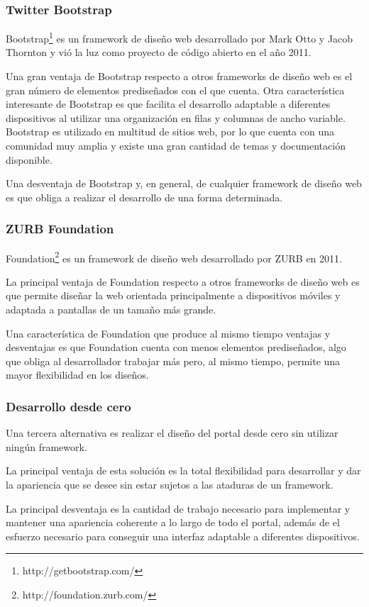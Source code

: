 \subsubsection{Twitter Bootstrap}
Bootstrap\footnote{http://getbootstrap.com/} es un framework de diseño web desarrollado por Mark Otto y Jacob Thornton y vió la luz como proyecto de código abierto en el año 2011.

Una gran ventaja de Bootstrap respecto a otros frameworks de diseño web es el gran número de elementos prediseñados con el que cuenta. Otra característica interesante de Bootstrap es que facilita el desarrollo adaptable a diferentes dispositivos al utilizar una organización en filas y columnas de ancho variable.\\
Bootstrap es utilizado en multitud de sitios web, por lo que cuenta con una comunidad muy amplia y existe una gran cantidad de temas y documentación disponible.

Una desventaja de Bootstrap y, en general, de cualquier framework de diseño web es que obliga a realizar el desarrollo de una forma determinada.


\subsubsection{ZURB Foundation}
Foundation\footnote{http://foundation.zurb.com/} es un framework de diseño web desarrollado por ZURB en 2011.

La principal ventaja de Foundation respecto a otros frameworks de diseño web es que permite diseñar la web orientada principalmente a dispositivos móviles y adaptada a pantallas de un tamaño más grande.

Una característica de Foundation que produce al mismo tiempo ventajas y desventajas es que Foundation cuenta con menos elementos prediseñados, algo que obliga al desarrollador trabajar más pero, al mismo tiempo, permite una mayor flexibilidad en los diseños.


\subsubsection{Desarrollo desde cero}
Una tercera alternativa es realizar el diseño del portal desde cero sin utilizar ningún framework.

La principal ventaja de esta solución es la total flexibilidad para desarrollar y dar la apariencia que se desee sin estar sujetos a las ataduras de un framework.

La principal desventaja es la cantidad de trabajo necesario para implementar y mantener una apariencia coherente a lo largo de todo el portal, además de el esfuerzo necesario para conseguir una interfaz adaptable a diferentes dispositivos.



